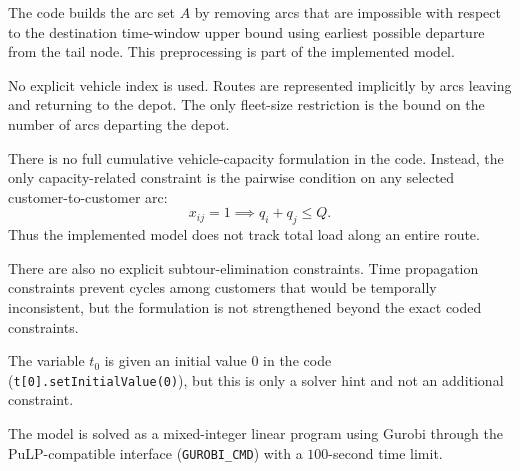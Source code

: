 The code builds the arc set \(A\) by removing arcs that are impossible with respect to the destination time-window upper bound using earliest possible departure from the tail node. This preprocessing is part of the implemented model.

No explicit vehicle index is used. Routes are represented implicitly by arcs leaving and returning to the depot. The only fleet-size restriction is the bound on the number of arcs departing the depot.

There is no full cumulative vehicle-capacity formulation in the code. Instead, the only capacity-related constraint is the pairwise condition on any selected customer-to-customer arc:
\[
x_{ij}=1 \implies q_i+q_j \le Q.
\]
Thus the implemented model does not track total load along an entire route.

There are also no explicit subtour-elimination constraints. Time propagation constraints prevent cycles among customers that would be temporally inconsistent, but the formulation is not strengthened beyond the exact coded constraints.

The variable \(t_0\) is given an initial value \(0\) in the code (\texttt{t[0].setInitialValue(0)}), but this is only a solver hint and not an additional constraint.

The model is solved as a mixed-integer linear program using Gurobi through the PuLP-compatible interface (\texttt{GUROBI\_CMD}) with a \(100\)-second time limit.
